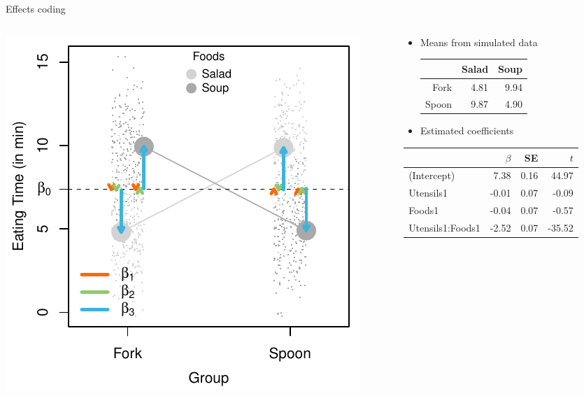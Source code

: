\documentclass[aspectratio=169]{beamer}
\begin{document}
\begin{frame}{Effects coding}
  \begin{columns}
    \begin{column}{.45\textwidth}
      \includegraphics[scale = .8]{../figures/contrasts_effects}
    \end{column}
    \begin{column}{.5\textwidth}
      \small
      \begin{itemize}
        \item Means from simulated data\vspace{.2cm}
\begin{tabular}{rrr}
  \hline
 & Salad & Soup \\ 
  \hline
Fork & 4.81 & 9.94 \\ 
  Spoon & 9.87 & 4.90 \\ 
   \hline
\end{tabular}
        \item Estimated coefficients
      \end{itemize}
      \begin{tabular}{@{}lrrr@{}}
  \hline
 & $\beta$ & SE & $t$ \\ 
  \hline
(Intercept) & 7.38 & 0.16 & 44.97 \\ 
  Utensils1 & -0.01 & 0.07 & -0.09 \\ 
  Foods1 & -0.04 & 0.07 & -0.57 \\ 
  Utensils1:Foods1 & -2.52 & 0.07 & -35.52 \\ 
   \hline
\end{tabular}
    \end{column}
  \end{columns}
\end{frame}
\end{document}
